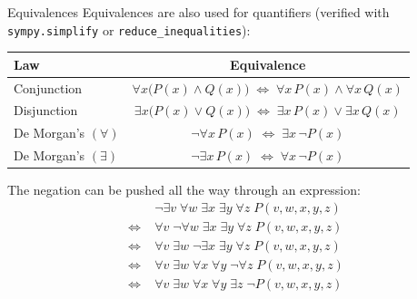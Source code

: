 \documentclass[aspectratio=169]{beamer}
\begin{document}
\begin{frame}{Equivalences}
  Equivalences are also used for quantifiers
  (verified with \texttt{sympy.simplify} or \texttt{reduce\_inequalities}):

  \medskip
  \begin{center}
    \renewcommand{\arraystretch}{1.45}
    \begin{tabular}{|l|c|}
      \hline
      \textbf{Law} & \textbf{Equivalence} \\
      \hline
      Conjunction &
        $\forall x\bigl(P(x)\wedge Q(x)\bigr)
         \;\Leftrightarrow\;
         \forall x\,P(x)\wedge\forall x\,Q(x)$ \\
      Disjunction &
        $\exists x\bigl(P(x)\vee Q(x)\bigr)
         \;\Leftrightarrow\;
         \exists x\,P(x)\vee\exists x\,Q(x)$ \\
      De Morgan's $(\forall)$ &
        $\neg\forall x\,P(x)
         \;\Leftrightarrow\;
         \exists x\,\neg P(x)$ \\
      De Morgan's $(\exists)$ &
        $\neg\exists x\,P(x)
         \;\Leftrightarrow\;
         \forall x\,\neg P(x)$ \\
      \hline
    \end{tabular}
  \end{center}

  \smallskip
  The negation can be pushed all the way through an expression:
  \begin{align*}
    &\neg\exists v\;\forall w\;\exists x\;\exists y\;\forall z\;P(v,w,x,y,z)\\
    \Leftrightarrow\;&\forall v\;\neg\forall w\;\exists x\;\exists y\;\forall z\;P(v,w,x,y,z)\\
    \Leftrightarrow\;&\forall v\;\exists w\;\neg\exists x\;\exists y\;\forall z\;P(v,w,x,y,z)\\
    \Leftrightarrow\;&\forall v\;\exists w\;\forall x\;\forall y\;\neg\forall z\;P(v,w,x,y,z)\\
    \Leftrightarrow\;&\forall v\;\exists w\;\forall x\;\forall y\;\exists z\;\neg P(v,w,x,y,z)
  \end{align*}
\end{frame}
\end{document}
